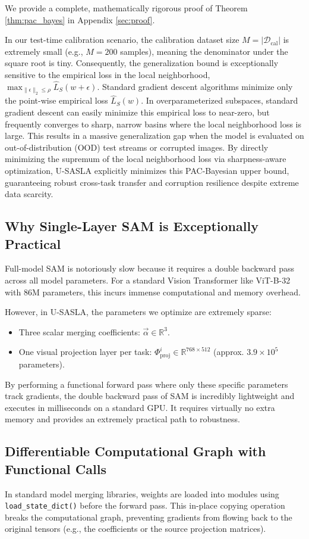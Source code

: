 \documentclass{article}
\theoremstyle{plain}
\theoremstyle{definition}
\theoremstyle{remark}
\begin{document}
We provide a complete, mathematically rigorous proof of Theorem \ref{thm:pac_bayes} in Appendix \ref{sec:proof}. 

In our test-time calibration scenario, the calibration dataset size $M = |\mathcal{D}_{\text{cal}}|$ is extremely small (e.g., $M = 200$ samples), meaning the denominator under the square root is tiny. Consequently, the generalization bound is exceptionally sensitive to the empirical loss in the local neighborhood, $\max_{\|\epsilon\|_2 \le \rho} \widehat{L}_{S}(w + \epsilon)$. Standard gradient descent algorithms minimize only the point-wise empirical loss $\widehat{L}_{S}(w)$. In overparameterized subspaces, standard gradient descent can easily minimize this empirical loss to near-zero, but frequently converges to sharp, narrow basins where the local neighborhood loss is large. This results in a massive generalization gap when the model is evaluated on out-of-distribution (OOD) test streams or corrupted images. By directly minimizing the supremum of the local neighborhood loss via sharpness-aware optimization, U-SASLA explicitly minimizes this PAC-Bayesian upper bound, guaranteeing robust cross-task transfer and corruption resilience despite extreme data scarcity.

\subsection{Why Single-Layer SAM is Exceptionally Practical}
Full-model SAM is notoriously slow because it requires a double backward pass across all model parameters. For a standard Vision Transformer like ViT-B-32 with $86\text{M}$ parameters, this incurs immense computational and memory overhead. 

However, in U-SASLA, the parameters we optimize are extremely sparse:
\begin{itemize}
    \item Three scalar merging coefficients: $\vec{\alpha} \in \mathbb{R}^3$.
    \item One visual projection layer per task: $\Phi_{\text{proj}}^i \in \mathbb{R}^{768 \times 512}$ (approx. $3.9 \times 10^5$ parameters).
\end{itemize}
By performing a functional forward pass where only these specific parameters track gradients, the double backward pass of SAM is incredibly lightweight and executes in milliseconds on a standard GPU. It requires virtually no extra memory and provides an extremely practical path to robustness.

\subsection{Differentiable Computational Graph with Functional Calls}
In standard model merging libraries, weights are loaded into modules using \texttt{load\_state\_dict()} before the forward pass. This in-place copying operation breaks the computational graph, preventing gradients from flowing back to the original tensors (e.g., the coefficients or the source projection matrices). 
\end{document}
